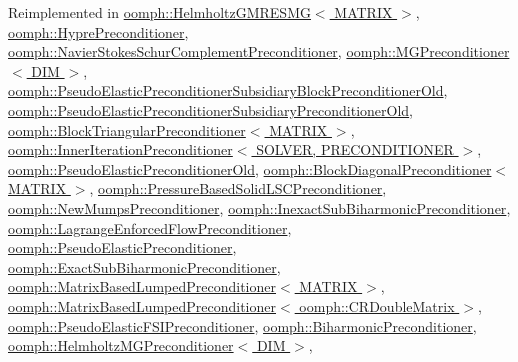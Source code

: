 Reimplemented in \hyperlink{classoomph_1_1HelmholtzGMRESMG_a81ddd10ccc03d6582dcadbd5cae1edda}{oomph\+::\+Helmholtz\+G\+M\+R\+E\+S\+M\+G$<$ M\+A\+T\+R\+I\+X $>$}, \hyperlink{classoomph_1_1HyprePreconditioner_a4d2ffc88b3a9e9ba84f969211b433231}{oomph\+::\+Hypre\+Preconditioner}, \hyperlink{classoomph_1_1NavierStokesSchurComplementPreconditioner_a5cac2493de85690e3954949eb2a27d2c}{oomph\+::\+Navier\+Stokes\+Schur\+Complement\+Preconditioner}, \hyperlink{classoomph_1_1MGPreconditioner_acc92bd3f8c9b729283d35c1f4ae37dd2}{oomph\+::\+M\+G\+Preconditioner$<$ D\+I\+M $>$}, \hyperlink{classoomph_1_1PseudoElasticPreconditionerSubsidiaryBlockPreconditionerOld_a8bb2215735df1a583b4bc1b92bded1e6}{oomph\+::\+Pseudo\+Elastic\+Preconditioner\+Subsidiary\+Block\+Preconditioner\+Old}, \hyperlink{classoomph_1_1PseudoElasticPreconditionerSubsidiaryPreconditionerOld_a45086bd75b2d82f65deae8cac23c4c47}{oomph\+::\+Pseudo\+Elastic\+Preconditioner\+Subsidiary\+Preconditioner\+Old}, \hyperlink{classoomph_1_1BlockTriangularPreconditioner_aec59a3bb131cd924d3efa6873a187a0f}{oomph\+::\+Block\+Triangular\+Preconditioner$<$ M\+A\+T\+R\+I\+X $>$}, \hyperlink{classoomph_1_1InnerIterationPreconditioner_a15c06204c6555fc4228fda0c71fcfce8}{oomph\+::\+Inner\+Iteration\+Preconditioner$<$ S\+O\+L\+V\+E\+R, P\+R\+E\+C\+O\+N\+D\+I\+T\+I\+O\+N\+E\+R $>$}, \hyperlink{classoomph_1_1PseudoElasticPreconditionerOld_acadd6682a6d25534d7e2be1e95c4d0e6}{oomph\+::\+Pseudo\+Elastic\+Preconditioner\+Old}, \hyperlink{classoomph_1_1BlockDiagonalPreconditioner_aced1bed34b9f6a11903d5fd3ae42ece8}{oomph\+::\+Block\+Diagonal\+Preconditioner$<$ M\+A\+T\+R\+I\+X $>$}, \hyperlink{classoomph_1_1PressureBasedSolidLSCPreconditioner_ad83eb2ddd12350bcba2cb8db074de2bd}{oomph\+::\+Pressure\+Based\+Solid\+L\+S\+C\+Preconditioner}, \hyperlink{classoomph_1_1NewMumpsPreconditioner_a4a6cb6cc1207a765cc02ef47c6efa6e0}{oomph\+::\+New\+Mumps\+Preconditioner}, \hyperlink{classoomph_1_1InexactSubBiharmonicPreconditioner_a5a8e4b8f01a5192066f1ac095845f308}{oomph\+::\+Inexact\+Sub\+Biharmonic\+Preconditioner}, \hyperlink{classoomph_1_1LagrangeEnforcedFlowPreconditioner_ace8141de668eb2a172ef9a25c932134a}{oomph\+::\+Lagrange\+Enforced\+Flow\+Preconditioner}, \hyperlink{classoomph_1_1PseudoElasticPreconditioner_adcc9487ec16eea12912b2f3a023b4129}{oomph\+::\+Pseudo\+Elastic\+Preconditioner}, \hyperlink{classoomph_1_1ExactSubBiharmonicPreconditioner_a846adc01b62a36c06686b50c16f37ac6}{oomph\+::\+Exact\+Sub\+Biharmonic\+Preconditioner}, \hyperlink{classoomph_1_1MatrixBasedLumpedPreconditioner_a17703845dc37066eb6851e12b1f182cb}{oomph\+::\+Matrix\+Based\+Lumped\+Preconditioner$<$ M\+A\+T\+R\+I\+X $>$}, \hyperlink{classoomph_1_1MatrixBasedLumpedPreconditioner_a17703845dc37066eb6851e12b1f182cb}{oomph\+::\+Matrix\+Based\+Lumped\+Preconditioner$<$ oomph\+::\+C\+R\+Double\+Matrix $>$}, \hyperlink{classoomph_1_1PseudoElasticFSIPreconditioner_a15859381010faa40a47fdca28b281475}{oomph\+::\+Pseudo\+Elastic\+F\+S\+I\+Preconditioner}, \hyperlink{classoomph_1_1BiharmonicPreconditioner_a1eec48fe85c0246c1a9ba1ad4cfa74e6}{oomph\+::\+Biharmonic\+Preconditioner}, \hyperlink{classoomph_1_1HelmholtzMGPreconditioner_a8ffcf85fcfeac6c4d17c14c6ee35549b}{oomph\+::\+Helmholtz\+M\+G\+Preconditioner$<$ D\+I\+M $>$}, 
